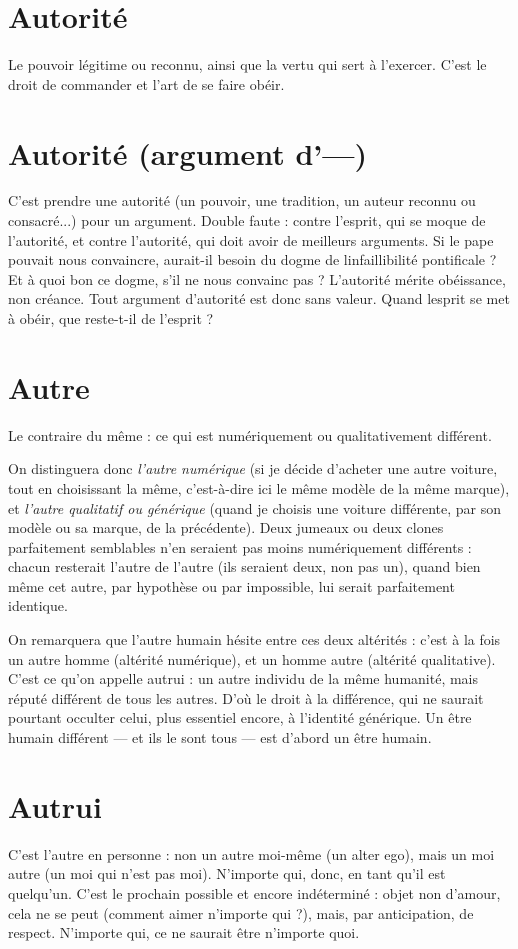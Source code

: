 \section{Autorité}
Le pouvoir légitime ou reconnu, ainsi que la vertu qui sert à
l'exercer. C’est le droit de commander et l’art de se faire obéir.

\section{Autorité (argument d’—)}
C'est prendre une autorité (un pouvoir, une
tradition, un auteur reconnu ou consacré...)
pour un argument. Double faute : contre l’esprit, qui se moque de
l'autorité, et contre l'autorité, qui doit avoir de meilleurs arguments. Si le pape
pouvait nous convaincre, aurait-il besoin du dogme de linfaillibilité
pontificale ? Et à quoi bon ce dogme, s’il ne nous convainc pas ?
L'autorité mérite obéissance, non créance. Tout argument d’autorité est
donc sans valeur. Quand lesprit se met à obéir, que reste-t-il de l'esprit ?

\section{Autre}
Le contraire du même : ce qui est numériquement ou qualitativement différent.

On distinguera donc {\it l'autre numérique} (si je décide d’acheter une autre voiture,
tout en choisissant la même, c’est-à-dire ici le même modèle de la même
marque), et {\it l'autre qualitatif ou générique} (quand je choisis une voiture différente,
par son modèle ou sa marque, de la précédente). Deux jumeaux ou deux
clones parfaitement semblables n’en seraient pas moins numériquement
différents : chacun resterait l’autre de l’autre (ils seraient deux, non pas un),
quand bien même cet autre, par hypothèse ou par impossible, lui serait parfaitement
identique.

On remarquera que l’autre humain hésite entre ces deux altérités : c’est à
la fois un autre homme (altérité numérique), et un homme autre (altérité
qualitative). C’est ce qu’on appelle autrui : un autre individu de la même
humanité, mais réputé différent de tous les autres. D’où le droit à la différence,
qui ne saurait pourtant occulter celui, plus essentiel encore, à l’identité
générique. Un être humain différent — et ils le sont tous — est d’abord un être
humain.

\section{Autrui}
C'est l’autre en personne : non un autre moi-même (un alter ego),
mais un moi autre (un moi qui n’est pas moi). N’importe qui,
donc, en tant qu’il est quelqu'un.
C’est le prochain possible et encore indéterminé : objet non d’amour, cela
ne se peut (comment aimer n’importe qui ?), mais, par anticipation, de respect.
N'importe qui, ce ne saurait être n’importe quoi.

